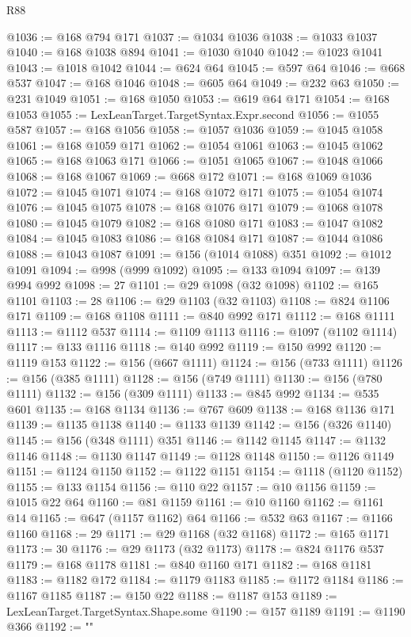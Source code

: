 \begin{lexlean}{R88}
\begin{coremodule}
@1036 := @168 @794 @171
@1037 := @1034 @1036
@1038 := @1033 @1037
@1040 := @168 @1038 @894
@1041 := @1030 @1040
@1042 := @1023 @1041
@1043 := @1018 @1042
@1044 := @624 @64
@1045 := @597 @64
@1046 := @668 @537
@1047 := @168 @1046
@1048 := @605 @64
@1049 := @232 @63
@1050 := @231 @1049
@1051 := @168 @1050
@1053 := @619 @64 @171
@1054 := @168 @1053
@1055 := LexLeanTarget.TargetSyntax.Expr.second
@1056 := @1055 @587
@1057 := @168 @1056
@1058 := @1057 @1036
@1059 := @1045 @1058
@1061 := @168 @1059 @171
@1062 := @1054 @1061
@1063 := @1045 @1062
@1065 := @168 @1063 @171
@1066 := @1051 @1065
@1067 := @1048 @1066
@1068 := @168 @1067
@1069 := @668 @172
@1071 := @168 @1069 @1036
@1072 := @1045 @1071
@1074 := @168 @1072 @171
@1075 := @1054 @1074
@1076 := @1045 @1075
@1078 := @168 @1076 @171
@1079 := @1068 @1078
@1080 := @1045 @1079
@1082 := @168 @1080 @171
@1083 := @1047 @1082
@1084 := @1045 @1083
@1086 := @168 @1084 @171
@1087 := @1044 @1086
@1088 := @1043 @1087
@1091 := @156 (@1014 @1088) @351
@1092 := @1012 @1091
@1094 := @998 (@999 @1092)
@1095 := @133 @1094
@1097 := @139 @994 @992
@1098 := 27
@1101 := @29 @1098 (@32 @1098)
@1102 := @165 @1101
@1103 := 28
@1106 := @29 @1103 (@32 @1103)
@1108 := @824 @1106 @171
@1109 := @168 @1108
@1111 := @840 @992 @171
@1112 := @168 @1111
@1113 := @1112 @537
@1114 := @1109 @1113
@1116 := @1097 (@1102 @1114)
@1117 := @133 @1116
@1118 := @140 @992
@1119 := @150 @992
@1120 := @1119 @153
@1122 := @156 (@667 @1111)
@1124 := @156 (@733 @1111)
@1126 := @156 (@385 @1111)
@1128 := @156 (@749 @1111)
@1130 := @156 (@780 @1111)
@1132 := @156 (@309 @1111)
@1133 := @845 @992
@1134 := @535 @601
@1135 := @168 @1134
@1136 := @767 @609
@1138 := @168 @1136 @171
@1139 := @1135 @1138
@1140 := @1133 @1139
@1142 := @156 (@326 @1140)
@1145 := @156 (@348 @1111) @351
@1146 := @1142 @1145
@1147 := @1132 @1146
@1148 := @1130 @1147
@1149 := @1128 @1148
@1150 := @1126 @1149
@1151 := @1124 @1150
@1152 := @1122 @1151
@1154 := @1118 (@1120 @1152)
@1155 := @133 @1154
@1156 := @110 @22
@1157 := @10 @1156
@1159 := @1015 @22 @64
@1160 := @81 @1159
@1161 := @10 @1160
@1162 := @1161 @14
@1165 := @647 (@1157 @1162) @64
@1166 := @532 @63
@1167 := @1166 @1160
@1168 := 29
@1171 := @29 @1168 (@32 @1168)
@1172 := @165 @1171
@1173 := 30
@1176 := @29 @1173 (@32 @1173)
@1178 := @824 @1176 @537
@1179 := @168 @1178
@1181 := @840 @1160 @171
@1182 := @168 @1181
@1183 := @1182 @172
@1184 := @1179 @1183
@1185 := @1172 @1184
@1186 := @1167 @1185
@1187 := @150 @22
@1188 := @1187 @153
@1189 := LexLeanTarget.TargetSyntax.Shape.some
@1190 := @157 @1189
@1191 := @1190 @366
@1192 := "{"
}
\end{coremodule}
\end{lexlean}
